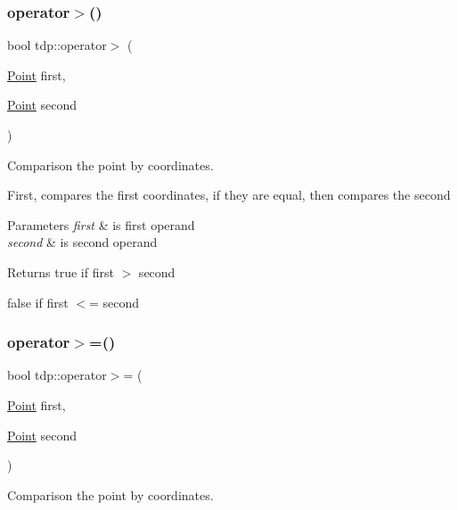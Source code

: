 \subsubsection{\texorpdfstring{operator$>$()}{operator>()}}
{\footnotesize\ttfamily bool tdp\+::operator$>$ (\begin{DoxyParamCaption}\item[{\mbox{\hyperlink{structtdp_1_1_point}{Point}}}]{first,  }\item[{\mbox{\hyperlink{structtdp_1_1_point}{Point}}}]{second }\end{DoxyParamCaption})}



Comparison the point by coordinates. 

First, compares the first coordinates, if they are equal, then compares the second 
\begin{DoxyParams}{Parameters}
{\em first} & is first operand \\
\hline
{\em second} & is second operand \\
\hline
\end{DoxyParams}
\begin{DoxyReturn}{Returns}
true if \textquotesingle{}first\textquotesingle{} $>$ \textquotesingle{}second\textquotesingle{} 

false if \textquotesingle{}first\textquotesingle{} $<$= \textquotesingle{}second\textquotesingle{} 
\end{DoxyReturn}
\mbox{\label{namespacetdp_a88169ae92b50b53e80d23d8df9d263d1}} 
\subsubsection{\texorpdfstring{operator$>$=()}{operator>=()}}
{\footnotesize\ttfamily bool tdp\+::operator$>$= (\begin{DoxyParamCaption}\item[{\mbox{\hyperlink{structtdp_1_1_point}{Point}}}]{first,  }\item[{\mbox{\hyperlink{structtdp_1_1_point}{Point}}}]{second }\end{DoxyParamCaption})}



Comparison the point by coordinates. 

